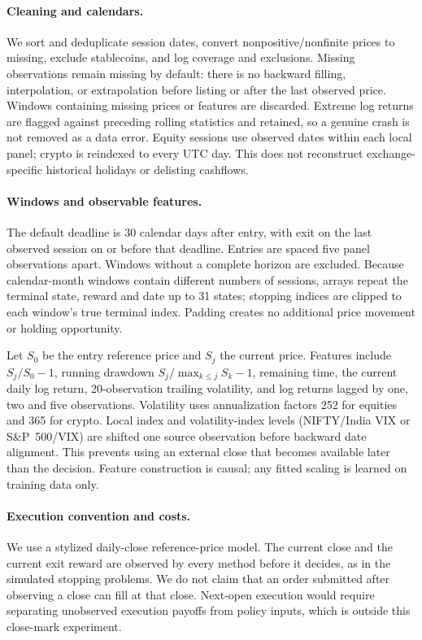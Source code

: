 \paragraph{Cleaning and calendars.}
We sort and deduplicate session dates, convert nonpositive/nonfinite prices to missing,
exclude stablecoins, and log coverage and exclusions. Missing observations remain
missing by default: there is no backward filling, interpolation, or extrapolation
before listing or after the last observed price. Windows containing missing prices
or features are discarded. Extreme log returns are flagged against preceding rolling
statistics and retained, so a genuine crash is not removed as a data error. Equity
sessions use observed dates within each local panel; crypto is reindexed to every UTC
day. This does not reconstruct exchange-specific historical holidays or delisting cashflows.

\paragraph{Windows and observable features.}
The default deadline is 30 calendar days after entry, with exit on the last observed
session on or before that deadline. Entries are spaced five panel observations apart.
Windows without a complete horizon are excluded. Because calendar-month windows
contain different numbers of sessions, arrays repeat the terminal state, reward and
date up to 31 states; stopping indices are clipped to each window's true terminal
index. Padding creates no additional price movement or holding opportunity.

Let $S_0$ be the entry reference price and $S_j$ the current price. Features include
$S_j/S_0-1$, running drawdown $S_j/\max_{k\leq j}S_k-1$, remaining time, the current
daily log return, 20-observation trailing volatility, and log returns lagged by one,
two and five observations. Volatility uses annualization factors 252 for equities
and 365 for crypto. Local index and volatility-index levels (NIFTY/India VIX or
S\&P~500/VIX) are shifted one source observation before backward date alignment.
This prevents using an external close that becomes available later than the decision.
Feature construction is causal; any fitted scaling is learned on training data only.

\paragraph{Execution convention and costs.}
We use a stylized daily-close reference-price model. The current close and the current
exit reward are observed by every method before it decides, as in the simulated
stopping problems. We do not claim that an order submitted after observing a close can fill
at that close. Next-open execution would require separating unobserved execution
payoffs from policy inputs, which is outside this close-mark experiment.


